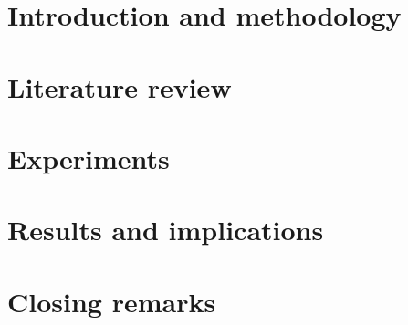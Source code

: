 \documentclass[english]{his-thesis}
\begin{document}
%

\tableofcontents
\listoffigures
\listoftables


\cleardoublepage
{}%
\setcounter{page}{1}%
\pagestyle{headings}

\part{Introduction and methodology}


\part{Literature review}

\part{Experiments}


\part{Results and implications}




\part{Closing remarks}


%


\listofreferences

\dissertationlist
\end{document}
